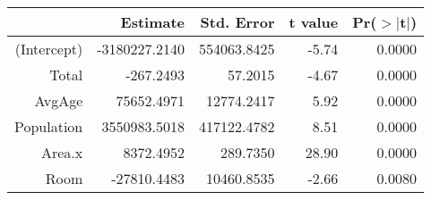 \begin{table}[ht]
\centering
\begin{tabular}{rrrrr}
  \hline
 & Estimate & Std. Error & t value & Pr($>$$|$t$|$) \\ 
  \hline
(Intercept) & -3180227.2140 & 554063.8425 & -5.74 & 0.0000 \\ 
  Total & -267.2493 & 57.2015 & -4.67 & 0.0000 \\ 
  AvgAge & 75652.4971 & 12774.2417 & 5.92 & 0.0000 \\ 
  Population & 3550983.5018 & 417122.4782 & 8.51 & 0.0000 \\ 
  Area.x & 8372.4952 & 289.7350 & 28.90 & 0.0000 \\ 
  Room & -27810.4483 & 10460.8535 & -2.66 & 0.0080 \\ 
   \hline
\end{tabular}
\end{table}
